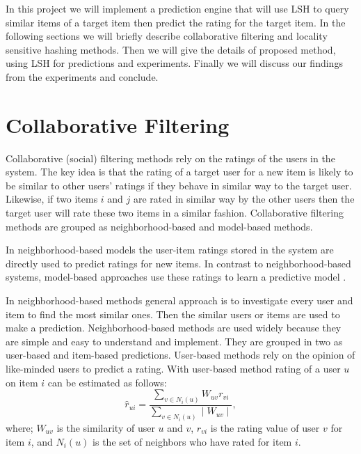 \documentclass[conference]{IEEEtran}
\begin{document}
In this project we will implement a prediction engine that will use LSH to 
query similar items of a target item then predict the rating for the target 
item. In the following sections we will briefly describe collaborative 
filtering and locality sensitive hashing methods. Then we will give the details 
of proposed method, using LSH for predictions and experiments. Finally we will 
discuss our findings from the experiments and conclude. 


 


\section{Collaborative Filtering}
\label{sec:cf}

Collaborative (social) filtering methods rely on the ratings of the users in the 
system. The key idea is that the rating of a target user for a new item is likely 
to be similar to other users' ratings if they behave in similar way to the target 
user. Likewise, if two items $i$ and $j$ are rated in similar way by the other users 
then the target user will rate these two items in a similar fashion. Collaborative 
filtering methods are grouped as neighborhood-based and model-based methods. 

In  neighborhood-based models the user-item ratings stored in the system are
directly used to predict ratings for new items. In contrast to neighborhood-based 
systems, model-based approaches use these ratings to learn a predictive model 
\cite{DBLP:journals/ir/HerlockerKR02}.

In neighborhood-based methods general approach is to investigate every user and 
item to find the most similar ones. Then the similar users or items are used to 
make a prediction. Neighborhood-based methods are used widely because they are 
simple and easy to understand and implement. They are grouped in two as user-based 
and item-based predictions. User-based methods rely on the opinion of like-minded 
users to predict a rating. With user-based method rating of a user $u$ on item $i$ 
can be estimated as follows:
\[
\hat{r}_{ui} = \frac{\sum\limits_{v \in N_i(u)} W_{uv}r_{vi}}{\sum\limits_{v \in N_i(u)} \mid W_{uv} \mid},
\]
where; $W_{uv}$ is the similarity of user $u$ and $v$, $r_{vi}$ is the rating value 
of user $v$ for item $i$, and $N_i(u)$ is the set of neighbors who have rated for  
item $i$.
\end{document}
